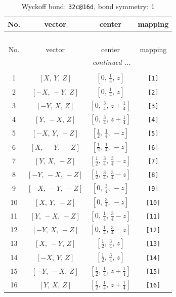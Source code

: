 \documentclass[fleqn,8pt]{jsarticle}
\begin{document}
\begin{longtable}{cccc}
\caption{Wyckoff bond: {\tt 32c@16d}, bond symmetry: {\tt 1}}
 \\
 \hline \hline
No. & vector & center & mapping \\ \hline \endfirsthead

\multicolumn{3}{l}{\tablename\ \thetable{}} \\
 \hline \hline
No. & vector & center & mapping \\ \hline \endhead

 \hline \hline
\multicolumn{3}{r}{\footnotesize\it continued ...} \\ \endfoot

 \hline \hline
\multicolumn{3}{r}{} \\ \endlastfoot

1 & $\left[ X,\, Y,\, Z \right]$ & $\left[ 0,\, \frac{1}{4},\, z \right]$ & {\tt [1]} \\ \hline
2 & $\left[ - X,\, - Y,\, Z \right]$ & $\left[ 0,\, \frac{1}{4},\, z \right]$ & {\tt [2]} \\ \hline
3 & $\left[ - Y,\, X,\, Z \right]$ & $\left[ 0,\, \frac{3}{4},\, z + \frac{1}{4} \right]$ & {\tt [3]} \\ \hline
4 & $\left[ Y,\, - X,\, Z \right]$ & $\left[ 0,\, \frac{3}{4},\, z + \frac{1}{4} \right]$ & {\tt [4]} \\ \hline
5 & $\left[ - X,\, Y,\, - Z \right]$ & $\left[ \frac{1}{2},\, \frac{1}{4},\, - z \right]$ & {\tt [5]} \\ \hline
6 & $\left[ X,\, - Y,\, - Z \right]$ & $\left[ \frac{1}{2},\, \frac{1}{4},\, - z \right]$ & {\tt [6]} \\ \hline
7 & $\left[ Y,\, X,\, - Z \right]$ & $\left[ \frac{1}{2},\, \frac{3}{4},\, \frac{3}{4} - z \right]$ & {\tt [7]} \\ \hline
8 & $\left[ - Y,\, - X,\, - Z \right]$ & $\left[ \frac{1}{2},\, \frac{3}{4},\, \frac{3}{4} - z \right]$ & {\tt [8]} \\ \hline
9 & $\left[ - X,\, - Y,\, - Z \right]$ & $\left[ 0,\, \frac{3}{4},\, - z \right]$ & {\tt [9]} \\ \hline
10 & $\left[ X,\, Y,\, - Z \right]$ & $\left[ 0,\, \frac{3}{4},\, - z \right]$ & {\tt [10]} \\ \hline
11 & $\left[ Y,\, - X,\, - Z \right]$ & $\left[ 0,\, \frac{1}{4},\, \frac{3}{4} - z \right]$ & {\tt [11]} \\ \hline
12 & $\left[ - Y,\, X,\, - Z \right]$ & $\left[ 0,\, \frac{1}{4},\, \frac{3}{4} - z \right]$ & {\tt [12]} \\ \hline
13 & $\left[ X,\, - Y,\, Z \right]$ & $\left[ \frac{1}{2},\, \frac{3}{4},\, z \right]$ & {\tt [13]} \\ \hline
14 & $\left[ - X,\, Y,\, Z \right]$ & $\left[ \frac{1}{2},\, \frac{3}{4},\, z \right]$ & {\tt [14]} \\ \hline
15 & $\left[ - Y,\, - X,\, Z \right]$ & $\left[ \frac{1}{2},\, \frac{1}{4},\, z + \frac{1}{4} \right]$ & {\tt [15]} \\ \hline
16 & $\left[ Y,\, X,\, Z \right]$ & $\left[ \frac{1}{2},\, \frac{1}{4},\, z + \frac{1}{4} \right]$ & {\tt [16]} \\
\end{longtable}
\end{document}
